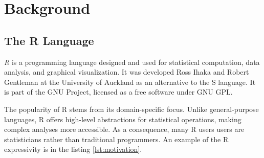 \chapter{Background}

\begin{chapterabstract}
	\todoadd
\end{chapterabstract}

\section{The R Language}

\textit{R}\cite{r} is a programming language designed and used for statistical computation, data analysis, and graphical visualization. It was developed Ross Ihaka and Robert Gentleman at the University of Auckland as an alternative to the S language. It is part of the GNU Project, licensed as a free software under GNU GPL.

The popularity of R stems from its domain-specific focus. Unlike general-purpose languages, R offers high-level abstractions for statistical operations, making complex analyses more accessible. As a consequence, many R users users are statisticians rather than traditional programmers. An example of the R expressivity is in the listing \ref{lst:motivation}.

